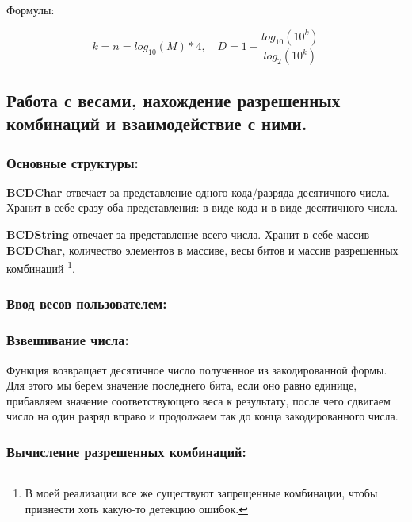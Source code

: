 \documentclass[12pt, a4paper]{report}
\begin{document}


Формулы:

$$ k = n = log_{10}(M) * 4, \quad D = 1 - \frac{log_{10}(10^{k})}{log_{2}(10^k)} $$

\newpage
\subsection*{Работа с весами, нахождение разрешенных комбинаций и взаимодействие с ними.}

\subsubsection*{Основные структуры:}



\textbf{BCDChar} отвечает за представление одного кода/разряда десятичного числа. Хранит в себе сразу оба представления: в виде кода и в виде десятичного числа. 

\textbf{BCDString} отвечает за представление всего числа. Хранит в себе массив \textbf{BCDChar}, количество элементов в массиве, весы битов и массив разрешенных комбинаций \footnote{В моей реализации все же существуют запрещенные комбинации, чтобы привнести хоть какую-то детекцию ошибок.}.

\subsubsection*{Ввод весов пользователем:}



\subsubsection*{Взвешивание числа:}



Функция возвращает десятичное число полученное из закодированной формы. Для этого мы берем значение последнего бита, если оно равно единице, прибавляем значение соответствующего веса к результату, после чего сдвигаем число на один разряд вправо и продолжаем так до конца закодированного числа.

\subsubsection*{Вычисление разрешенных комбинаций:}
\end{document}
